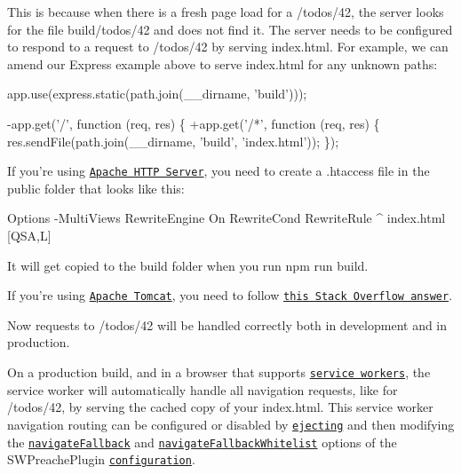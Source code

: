 This is because when there is a fresh page load for a {\ttfamily /todos/42}, the server looks for the file {\ttfamily build/todos/42} and does not find it. The server needs to be configured to respond to a request to {\ttfamily /todos/42} by serving {\ttfamily index.\+html}. For example, we can amend our Express example above to serve {\ttfamily index.\+html} for any unknown paths\+:


\begin{DoxyCode}
 app.use(express.static(path.join(\_\_dirname, 'build')));

-app.get('/', function (req, res) \{
+app.get('/*', function (req, res) \{
   res.sendFile(path.join(\_\_dirname, 'build', 'index.html'));
 \});
\end{DoxyCode}


If you’re using \href{https://httpd.apache.org/}{\tt Apache H\+T\+TP Server}, you need to create a {\ttfamily .htaccess} file in the {\ttfamily public} folder that looks like this\+:


\begin{DoxyCode}
Options -MultiViews
RewriteEngine On
RewriteCond %
RewriteRule ^ index.html [QSA,L]
\end{DoxyCode}


It will get copied to the {\ttfamily build} folder when you run {\ttfamily npm run build}.

If you’re using \href{http://tomcat.apache.org/}{\tt Apache Tomcat}, you need to follow \href{https://stackoverflow.com/a/41249464/4878474}{\tt this Stack Overflow answer}.

Now requests to {\ttfamily /todos/42} will be handled correctly both in development and in production.

On a production build, and in a browser that supports \href{https://developers.google.com/web/fundamentals/getting-started/primers/service-workers}{\tt service workers}, the service worker will automatically handle all navigation requests, like for {\ttfamily /todos/42}, by serving the cached copy of your {\ttfamily index.\+html}. This service worker navigation routing can be configured or disabled by \href{#npm-run-eject}{\tt {\ttfamily eject}ing} and then modifying the \href{https://github.com/GoogleChrome/sw-precache#navigatefallback-string}{\tt {\ttfamily navigate\+Fallback}} and \href{https://github.com/GoogleChrome/sw-precache#navigatefallbackwhitelist-arrayregexp}{\tt {\ttfamily navigate\+Fallback\+Whitelist}} options of the {\ttfamily S\+W\+Preache\+Plugin} \href{../config/webpack.config.prod.js}{\tt configuration}.

